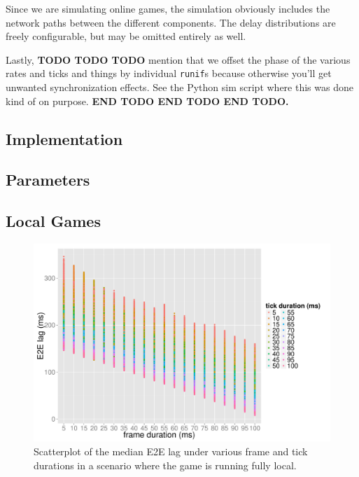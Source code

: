 Since we are simulating online games, the simulation obviously includes 
the network paths between the different components. The delay distributions 
are freely configurable, but may be omitted entirely as well.


Lastly, \textbf{TODO TODO TODO} 
mention that we offset the phase of the various 
rates and ticks and things by individual \texttt{runif}s because 
otherwise you'll get unwanted synchronization effects. See the Python sim 
script where this was done kind of on purpose. 
\textbf{END TODO END TODO END TODO.}



\subsection{Implementation}

\subsection{Parameters}


\subsection{Local Games}

\begin{figure}[!t]
	\centering
	\includegraphics[width=1.0\columnwidth]{../simulation/visualization/nwless-onlinegame-1000rounds.pdf}
	\caption{Scatterplot of the median E2E lag under various frame and tick durations in a scenario where the game is running fully local.}
\label{fig:nwless-scatter}
\end{figure}


